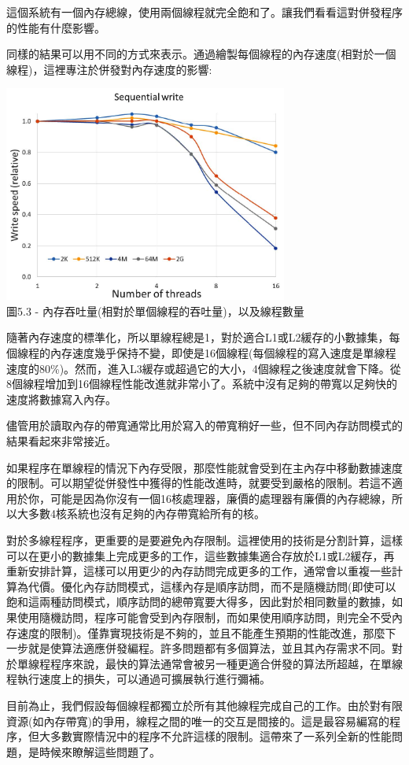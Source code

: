 這個系統有一個內存總線，使用兩個線程就完全飽和了。讓我們看看這對併發程序的性能有什麼影響。


同樣的結果可以用不同的方式來表示。通過繪製每個線程的內存速度(相對於一個線程)，這裡專注於併發對內存速度的影響:

\begin{center}
\includegraphics[width=0.7\textwidth]{content/1/chapter5/images/3.jpg}\\
圖5.3 - 內存吞吐量(相對於單個線程的吞吐量)，以及線程數量
\end{center}

隨著內存速度的標準化，所以單線程總是1，對於適合L1或L2緩存的小數據集，每個線程的內存速度幾乎保持不變，即使是16個線程(每個線程的寫入速度是單線程速度的80\%)。然而，進入L3緩存或超過它的大小，4個線程之後速度就會下降。從8個線程增加到16個線程性能改進就非常小了。系統中沒有足夠的帶寬以足夠快的速度將數據寫入內存。

儘管用於讀取內存的帶寬通常比用於寫入的帶寬稍好一些，但不同內存訪問模式的結果看起來非常接近。

如果程序在單線程的情況下內存受限，那麼性能就會受到在主內存中移動數據速度的限制。可以期望從併發性中獲得的性能改進時，就要受到嚴格的限制。若這不適用於你，可能是因為你沒有一個16核處理器，廉價的處理器有廉價的內存總線，所以大多數4核系統也沒有足夠的內存帶寬給所有的核。

對於多線程程序，更重要的是要避免內存限制。這裡使用的技術是分割計算，這樣可以在更小的數據集上完成更多的工作，這些數據集適合存放於L1或L2緩存，再重新安排計算，這樣可以用更少的內存訪問完成更多的工作，通常會以重複一些計算為代價。優化內存訪問模式，這樣內存是順序訪問，而不是隨機訪問(即使可以飽和這兩種訪問模式，順序訪問的總帶寬要大得多，因此對於相同數量的數據，如果使用隨機訪問，程序可能會受到內存限制，而如果使用順序訪問，則完全不受內存速度的限制)。僅靠實現技術是不夠的，並且不能產生預期的性能改進，那麼下一步就是使算法適應併發編程。許多問題都有多個算法，並且其內存需求不同。對於單線程程序來說，最快的算法通常會被另一種更適合併發的算法所超越，在單線程執行速度上的損失，可以通過可擴展執行進行彌補。

目前為止，我們假設每個線程都獨立於所有其他線程完成自己的工作。由於對有限資源(如內存帶寬)的爭用，線程之間的唯一的交互是間接的。這是最容易編寫的程序，但大多數實際情況中的程序不允許這樣的限制。這帶來了一系列全新的性能問題，是時候來瞭解這些問題了。


















